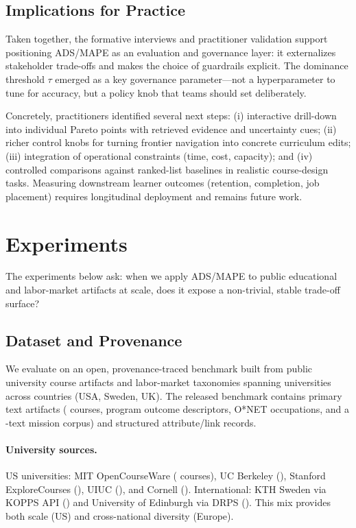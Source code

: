 \documentclass[sigconf,review]{acmart}
\newcommand{\ADS}{\textsc{ADS}\xspace}
\newcommand{\MAPE}{\textsc{MAPE}\xspace}
\begin{document}
\subsection{Implications for Practice}
Taken together, the formative interviews and practitioner validation support positioning \ADS/\MAPE as an evaluation and governance layer: it externalizes stakeholder trade-offs and makes the choice of guardrails explicit. The dominance threshold $\tau$ emerged as a key governance parameter---not a hyperparameter to tune for accuracy, but a policy knob that teams should set deliberately.

Concretely, practitioners identified several next steps: (i) interactive drill-down into individual Pareto points with retrieved evidence and uncertainty cues; (ii) richer control knobs for turning frontier navigation into concrete curriculum edits; (iii) integration of operational constraints (time, cost, capacity); and (iv) controlled comparisons against ranked-list baselines in realistic course-design tasks. Measuring downstream learner outcomes (retention, completion, job placement) requires longitudinal deployment and remains future work.


\section{Experiments}
\label{sec:experiments}

The experiments below ask: when we apply \ADS/\MAPE to public educational and labor-market artifacts at scale, does it expose a non-trivial, stable trade-off surface?

\subsection{Dataset and Provenance}
\label{subsec:data}

We evaluate on an open, provenance-traced benchmark built from public university course artifacts and labor-market taxonomies spanning {\NumUniversities} universities across {\NumCountries} countries (USA, Sweden, UK). The released benchmark contains {\NumPrimaryArtifacts} primary text artifacts ({\NumCourses} courses, {\NumPrograms} program outcome descriptors, {\NumOccupations} O*NET occupations, and a {\NumMissionsExpanded}-text mission corpus) and {\NumAttributeRecords} structured attribute/link records.

\paragraph{University sources.}
US universities: MIT OpenCourseWare ({\NumMIT} courses), UC Berkeley ({\NumUCB}), Stanford ExploreCourses ({\NumStanford}), UIUC ({\NumUIUC}), and Cornell ({\NumCornell}). International: KTH Sweden via KOPPS API ({\NumKTH}) and University of Edinburgh via DRPS ({\NumEdinburgh}). This mix provides both scale (US) and cross-national diversity (Europe).
\end{document}
